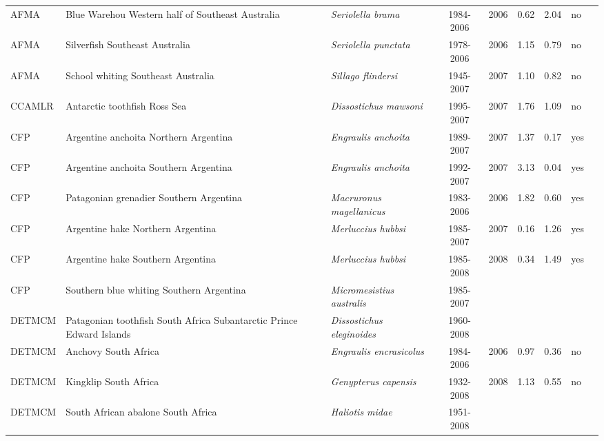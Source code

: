 \begin{longtable}{p{1.8cm}p{4cm}p{4cm}ccccp{1.9cm}c}
  AFMA & Blue Warehou Western half of Southeast Australia & \textit{Seriolella brama} & 1984-2006 & 2006 & 0.62 & 2.04 & no & \cite{WAREHOUSE.pdf} \\ 
  AFMA & Silverfish Southeast Australia & \textit{Seriolella punctata} & 1978-2006 & 2006 & 1.15 & 0.79 & no & \cite{SILVERFISHSE.pdf} \\ 
  AFMA & School whiting Southeast Australia & \textit{Sillago flindersi} & 1945-2007 & 2007 & 1.10 & 0.82 & no & \cite{SWHITSE.pdf} \\ 
  CCAMLR & Antarctic toothfish Ross Sea & \textit{Dissostichus mawsoni} & 1995-2007 & 2007 & 1.76 & 1.09 & no & \cite{ATOOTHFISHRS.pdf} \\ 
  CFP & Argentine anchoita Northern Argentina & \textit{Engraulis anchoita} & 1989-2007 & 2007 & 1.37 & 0.17 & yes & \cite{Hansen-ANCHOVY-N-2007.pdf} \\ 
  CFP & Argentine anchoita Southern Argentina & \textit{Engraulis anchoita} & 1992-2007 & 2007 & 3.13 & 0.04 & yes & \cite{Hansen-ANCHOVY-S-2007.pdf} \\ 
  CFP & Patagonian grenadier Southern Argentina & \textit{Macruronus magellanicus} & 1983-2006 & 2006 & 1.82 & 0.60 & yes & \cite{Giussi-hoki-2007.pdf} \\ 
  CFP & Argentine hake Northern Argentina & \textit{Merluccius hubbsi} & 1985-2007 & 2007 & 0.16 & 1.26 & yes & \cite{Irusta-hake-N-2007.pdf} \\ 
  CFP & Argentine hake Southern Argentina & \textit{Merluccius hubbsi} & 1985-2008 & 2008 & 0.34 & 1.49 & yes & \cite{Renzi-hake-S-2009.pdf} \\ 
  CFP &  Southern blue whiting Southern Argentina & \textit{Micromesistius australis} & 1985-2007 &  &  &  &  & \cite{Giussi-polaca-2007.pdf} \\ 
  DETMCM & Patagonian toothfish South Africa Subantarctic Prince Edward Islands & \textit{Dissostichus eleginoides} & 1960-2008 &  &  &  &  & \cite{Branch-SA-Toothfish-2007.pdf} \\ 
  DETMCM & Anchovy South Africa & \textit{Engraulis encrasicolus} & 1984-2006 & 2006 & 0.97 & 0.36 & no & \cite{ANCHOSA.pdf} \\ 
  DETMCM & Kingklip South Africa & \textit{Genypterus capensis} & 1932-2008 & 2008 & 1.13 & 0.55 & no & \cite{Branch-SA-Kingklip-2008.pdf} \\ 
  DETMCM & South African abalone South Africa & \textit{Haliotis midae} & 1951-2008 &  &  &  &  & \cite{Plaganyi-SA-abalone-2008NOVSWG-AB21.pdf} \\ 

\end{longtable}
